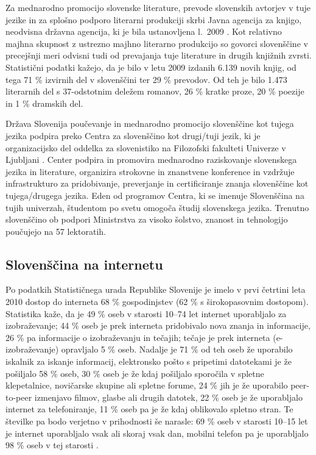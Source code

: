 \begin{multicols}{2}

Za mednarodno promocijo slovenske literature, prevode slovenskih avtorjev v tuje jezike in za splošno podporo literarni produkciji skrbi Javna agencija za knjigo, neodvisna državna agencija, ki je bila ustanov\-ljena l.~2009 \cite{JAKRS1}.  Kot relativno majhna skupnost z ustrezno majhno literarno produkcijo so go\-vor\-ci slovenščine v precejšnji meri odvisni tudi od prevajanja tuje literature in drugih knjižnih zvrsti. Statistični podatki kažejo, da je bilo v letu 2009 izdanih 6.139 novih knjig, od tega 71 \% izvirnih del v slovenščini ter 29 \% prevodov. Od teh je bilo 1.473 literarnih del s 37-odstotnim deležem romanov, 26 \% kratke proze, 20 \% poezije in 1 \% dramskih del.

Država Slovenija poučevanje in mednarodno promocijo slovenščine kot tujega jezika podpira preko Centra za slovenščino kot drugi/tuji jezik, ki je organizacij\-sko del oddelka za slovenistiko na Filozofski fakulteti Univerze v Ljub\-ljani \cite{CSDTJ1}.  Center podpira in promovira mednarodno raziskovanje slovenskega jezika in literature, organizira strokovne in znanstvene konference in vzdržuje infrastrukturo za pridobivanje, preverjanje in certificiranje znanja slovenščine kot tujega/drugega jezika. Eden od programov Centra, ki se imenuje Slovenščina na tujih univerzah, študentom po svetu omogoča študij slovenskega jezika. Trenutno slovenščino ob podpori Ministrstva za visoko šolstvo, znanost in tehnologijo poučujejo na 57 lektoratih. 

\subsection{Slovenščina na internetu}

Po podatkih Statističnega urada Republike Slovenije je imelo v prvi četrtini leta 2010 dostop do interneta 68 \% gospodinjstev (62 \% s širokopasovnim dostopom). Statistika kaže, da je 49 \% oseb v starosti 10–74 let internet uporab\-ljalo za izobraževanje; 44 \% oseb je prek interneta pridobivalo nova znanja in informacije, 26 \% pa informacije o izobraževanju in tečajih; tečaje je prek interneta (e-izobraževanje) oprav\-ljalo 5 \% oseb. Nadalje je 71 \% od teh oseb že uporabilo iskalnik za iskanje informacij, elektronsko pošto s pripetimi datotekami je že pošiljalo 58 \% oseb, 30 \% oseb je že kdaj pošiljalo sporočila v spletne klepetalnice, novičarske skupine ali spletne forume, 24 \% jih je že uporabilo peer-to-peer izmenjavo filmov, glasbe ali drugih datotek, 22 \% oseb je že uporab\-ljalo internet za telefoniranje, 11 \% oseb pa je že kdaj oblikovalo spletno stran. Te številke pa bodo verjetno v prihodnosti še narasle: 69 \% oseb v starosti 10–15 let je internet uporab\-ljalo vsak ali skoraj vsak dan, mobilni telefon pa je uporab\-ljalo 98 \% oseb v tej starosti \cite{SURS3}. 


\end{multicols}
